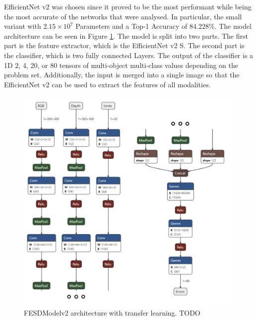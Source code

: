 EfficientNet v2 was chosen since it proved to be the most performant while being the most accurate of the networks that were analysed. In particular, the small variant with $2.15 \times 10^7$ Parameters and a Top-1 Accuracy of $84.228\%$. The model architecture can be seen in Figure \ref{fig:model_architecture_v2}. The model is split into two parts. The first part is the feature extractor, which is the EfficientNet v2 S. The second part is the classifier, which is two fully connected Layers. The output of the classifier is a 1D 2, 4, 20, or 80 tensors of multi-object multi-class values depending on the problem set. Additionally, the input is merged into a single image so that the EfficientNet v2 can be used to extract the features of all modalities.

\begin{figure}[h]
  \centering
  \includegraphics[width=\linewidth]{figures/Model/FESD.png}
  \caption[FESDModel architecture version 2]{FESDModelv2 architecture with transfer learning. TODO}
  \label{fig:model_architecture_v2}
\end{figure}


